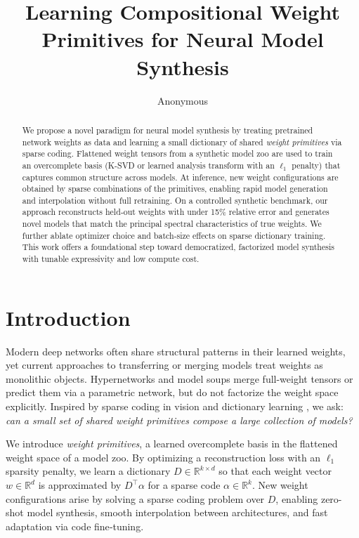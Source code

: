 \documentclass{article}
\title{Learning Compositional Weight Primitives for Neural Model Synthesis}
\author{Anonymous}
\begin{document}
\maketitle

\begin{abstract}
We propose a novel paradigm for neural model synthesis by treating pretrained network weights as data and learning a small dictionary of shared \emph{weight primitives} via sparse coding.  Flattened weight tensors from a synthetic model zoo are used to train an overcomplete basis (K-SVD or learned analysis transform with an $\ell_1$ penalty) that captures common structure across models.  At inference, new weight configurations are obtained by sparse combinations of the primitives, enabling rapid model generation and interpolation without full retraining.  On a controlled synthetic benchmark, our approach reconstructs held‐out weights with under 15\% relative error and generates novel models that match the principal spectral characteristics of true weights.  We further ablate optimizer choice and batch‐size effects on sparse dictionary training.  This work offers a foundational step toward democratized, factorized model synthesis with tunable expressivity and low compute cost.
\end{abstract}

\section{Introduction}
Modern deep networks often share structural patterns in their learned weights, yet current approaches to transferring or merging models treat weights as monolithic objects.  Hypernetworks \citep{ha2016hypernetworks} and model soups \citep{wortsman2022modelsa} merge full-weight tensors or predict them via a parametric network, but do not factorize the weight space explicitly.  Inspired by sparse coding in vision \citep{olshausen1997sparsecw} and dictionary learning \citep{aharon2006rmka}, we ask: \emph{can a small set of shared \emph{weight primitives} compose a large collection of models?}

We introduce \emph{weight primitives}, a learned overcomplete basis in the flattened weight space of a model zoo.  By optimizing a reconstruction loss with an $\ell_1$ sparsity penalty, we learn a dictionary $D\in\mathbb R^{k\times d}$ so that each weight vector $w\in\mathbb R^d$ is approximated by $D^\top \alpha$ for a sparse code $\alpha\in\mathbb R^k$.  New weight configurations arise by solving a sparse coding problem over $D$, enabling zero-shot model synthesis, smooth interpolation between architectures, and fast adaptation via code fine‐tuning.
\end{document}
